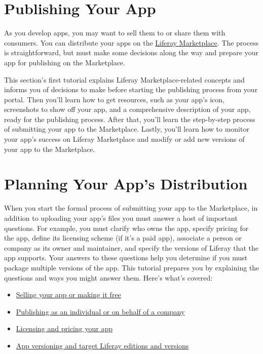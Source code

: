 \chapter{Publishing Your App}\label{publishing-your-app}

As you develop apps, you may want to sell them to or share them with
consumers. You can distribute your apps on the
\href{http://marketplace.liferay.com}{Liferay Marketplace}. The process
is straightforward, but must make some decisions along the way and
prepare your app for publishing on the Marketplace.

This section's first tutorial explains Liferay Marketplace-related
concepts and informs you of decisions to make before starting the
publishing process from your portal. Then you'll learn how to get
resources, such as your app's icon, screenshots to show off your app,
and a comprehensive description of your app, ready for the publishing
process. After that, you'll learn the step-by-step process of submitting
your app to the Marketplace. Lastly, you'll learn how to monitor your
app's success on Liferay Marketplace and modify or add new versions of
your app to the Marketplace.

\chapter{Planning Your App's
Distribution}\label{planning-your-apps-distribution}

When you start the formal process of submitting your app to the
Marketplace, in addition to uploading your app's files you must answer a
host of important questions. For example, you must clarify who owns the
app, specify pricing for the app, define its licensing scheme (if it's a
paid app), associate a person or company as its owner and maintainer,
and specify the versions of Liferay that the app supports. Your answers
to these questions help you determine if you must package multiple
versions of the app. This tutorial prepares you by explaining the
questions and ways you might answer them. Here's what's covered:

\begin{itemize}
\tightlist
\item
  \href{/how-to-publish/-/knowledge_base/publish/selling-your-app-or-making-it-free}{Selling
  your app or making it free}
\item
  \href{/how-to-publish/-/knowledge_base/publish/publishing-as-an-individual-or-on-behalf-of-a-company}{Publishing
  as an individual or on behalf of a company}
\item
  \href{/how-to-publish/-/knowledge_base/publish/licensing-and-pricing-your-app}{Licensing
  and pricing your app}
\item
  \href{/how-to-publish/-/knowledge_base/publish/targeting-liferay-editions-and-versions}{App
  versioning and target Liferay editions and versions}
\end{itemize}

